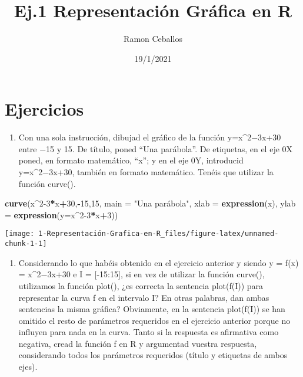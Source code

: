\documentclass[
]{article}
\title{Ej.1 Representación Gráfica en R}
\author{Ramon Ceballos}
\date{19/1/2021}
\newenvironment{Shaded}{\begin{snugshade}}{\end{snugshade}}
\newcommand{\DataTypeTok}[1]{\textcolor[rgb]{0.13,0.29,0.53}{#1}}
\newcommand{\DecValTok}[1]{\textcolor[rgb]{0.00,0.00,0.81}{#1}}
\newcommand{\KeywordTok}[1]{\textcolor[rgb]{0.13,0.29,0.53}{\textbf{#1}}}
\newcommand{\NormalTok}[1]{#1}
\newcommand{\OperatorTok}[1]{\textcolor[rgb]{0.81,0.36,0.00}{\textbf{#1}}}
\newcommand{\StringTok}[1]{\textcolor[rgb]{0.31,0.60,0.02}{#1}}
\providecommand{\tightlist}{%
  \setlength{\itemsep}{0pt}\setlength{\parskip}{0pt}}
\begin{document}
\maketitle

\hypertarget{ejercicios}{%
\section{Ejercicios}\label{ejercicios}}

\begin{enumerate}
\def\labelenumi{\arabic{enumi}.}
\tightlist
\item
  Con una sola instrucción, dibujad el gráfico de la función
  y=x\^{}2−3x+30 entre −15 y 15. De título, poned ``Una parábola''. De
  etiquetas, en el eje 0X poned, en formato matemático, ``x''; y en el
  eje 0Y, introducid y=x\^{}2−3x+30, también en formato matemático.
  Tenéis que utilizar la función curve().
\end{enumerate}

\begin{Shaded}
\begin{Highlighting}[]
\KeywordTok{curve}\NormalTok{(x}\OperatorTok{^}\DecValTok{2-3}\OperatorTok{*}\NormalTok{x}\OperatorTok{+}\DecValTok{30}\NormalTok{,}\OperatorTok{-}\DecValTok{15}\NormalTok{,}\DecValTok{15}\NormalTok{, }
      \DataTypeTok{main =} \StringTok{"Una parábola"}\NormalTok{, }
      \DataTypeTok{xlab =} \KeywordTok{expression}\NormalTok{(x), }
      \DataTypeTok{ylab =} \KeywordTok{expression}\NormalTok{(}\DataTypeTok{y=}\NormalTok{x}\OperatorTok{^}\DecValTok{2-3}\OperatorTok{*}\NormalTok{x}\OperatorTok{+}\DecValTok{3}\NormalTok{))}
\end{Highlighting}
\end{Shaded}

\begin{center}\texttt{[image: 1-Representación-Grafica-en-R\_files/figure-latex/unnamed-chunk-1-1]} \end{center}

\begin{enumerate}
\def\labelenumi{\arabic{enumi}.}
\setcounter{enumi}{1}
\tightlist
\item
  Considerando lo que habéis obtenido en el ejercicio anterior y siendo
  y = f(x) = x\^{}2−3x+30 e I = {[}-15:15{]}, si en vez de utilizar la
  función curve(), utilizamos la función plot(), ¿es correcta la
  sentencia plot(f(I)) para representar la curva f en el intervalo I? En
  otras palabras, dan ambas sentencias la misma gráfica? Obviamente, en
  la sentencia plot(f(I)) se han omitido el resto de parámetros
  requeridos en el ejercicio anterior porque no influyen para nada en la
  curva. Tanto si la respuesta es afirmativa como negativa, cread la
  función f en R y argumentad vuestra respuesta, considerando todos los
  parámetros requeridos (título y etiquetas de ambos ejes).
\end{enumerate}
\end{document}
